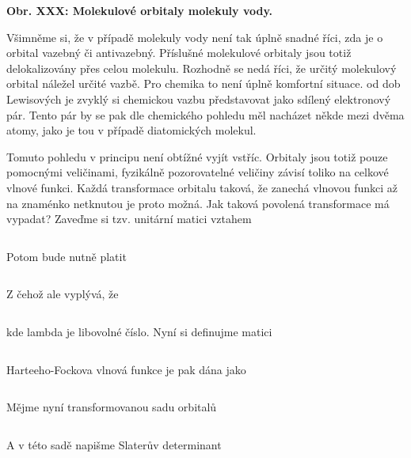 \bigskip

\textbf{Obr. XXX: Molekulové orbitaly molekuly vody.}

\bigskip
 
Všimněme si, že v případě molekuly vody není tak úplně snadné říci, zda je o orbital vazebný či antivazebný. Příslušné molekulové orbitaly jsou totiž delokalizovány přes celou molekulu. Rozhodně se nedá říci, že určitý molekulový orbital náležel určité vazbě. Pro chemika to není úplně komfortní situace. od dob Lewisových je zvyklý si chemickou vazbu představovat jako sdílený elektronový pár. Tento pár by se pak dle chemického pohledu měl nacházet někde mezi dvěma atomy, jako je tou v případě diatomických molekul. 

Tomuto pohledu v principu není obtížné vyjít vstříc. Orbitaly jsou totiž pouze pomocnými veličinami, fyzikálně pozorovatelné veličiny závisí toliko na celkové vlnové funkci. Každá transformace orbitalu taková, že zanechá vlnovou funkci až na znaménko netknutou je proto možná. Jak taková povolená transformace má vypadat? Zaveďme si tzv. unitární matici vztahem

\begin{equation}
\label{rov:XXX}
\end{equation}

Potom bude nutně platit

\begin{equation}
\label{rov:XXX}
\end{equation}

Z čehož ale vyplývá, že 

\begin{equation}
\label{rov:XXX}
\end{equation}


kde lambda je libovolné číslo. Nyní si definujme matici 


\begin{equation}
\label{rov:XXX}
\end{equation}


Harteeho-Fockova vlnová funkce je pak dána jako


\begin{equation}
\label{rov:XXX}
\end{equation}


Mějme nyní transformovanou sadu orbitalů


\begin{equation}
\label{rov:XXX}
\end{equation}


A v této sadě napišme Slaterův determinant

